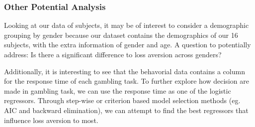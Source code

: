 \subsubsection{Other Potential Analysis}
\par Looking at our data of subjects, it may be of interest to consider a 
demographic grouping by gender because our dataset contains the demographics of 
our 16 subjects, with the extra information of gender and age. A question to 
potentially address: Is there a significant difference to loss aversion across
genders?

\par Additionally, it is interesting to see that the behavorial data contains a 
column for the response time of each gambling task. To further explore how 
decision are made in gambling task, we can use the response time as one of the 
logistic regressors. Through step-wise or criterion based model selection 
methods (eg. AIC and backward elimination), we can attempt to find the best 
regressors that influence loss aversion to most.
